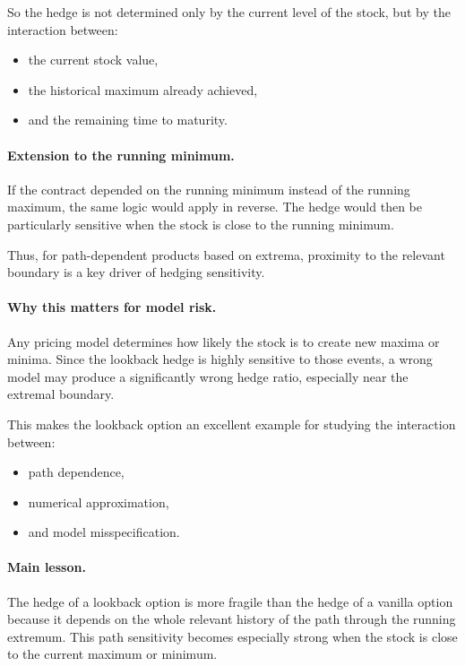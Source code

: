 \documentclass[11pt]{article}
\theoremstyle{plain}
\theoremstyle{definition}
\theoremstyle{remark}
\begin{document}
So the hedge is not determined only by the current level of the stock,
but by the interaction between:
\begin{itemize}[leftmargin=1.4em]
    \item the current stock value,
    \item the historical maximum already achieved,
    \item and the remaining time to maturity.
\end{itemize}

\paragraph{Extension to the running minimum.}
If the contract depended on the running minimum instead of the running
maximum, the same logic would apply in reverse.
The hedge would then be particularly sensitive when the stock is close
to the running minimum.

Thus, for path-dependent products based on extrema, proximity to the
relevant boundary is a key driver of hedging sensitivity.

\paragraph{Why this matters for model risk.}
Any pricing model determines how likely the stock is to create new
maxima or minima.
Since the lookback hedge is highly sensitive to those events, a wrong
model may produce a significantly wrong hedge ratio, especially near the
extremal boundary.

This makes the lookback option an excellent example for studying the
interaction between:
\begin{itemize}[leftmargin=1.4em]
    \item path dependence,
    \item numerical approximation,
    \item and model misspecification.
\end{itemize}

\paragraph{Main lesson.}
The hedge of a lookback option is more fragile than the hedge of a
vanilla option because it depends on the whole relevant history of the
path through the running extremum.
This path sensitivity becomes especially strong when the stock is close
to the current maximum or minimum.
\end{document}

